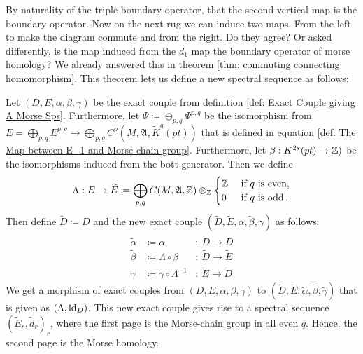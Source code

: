 \begin{corollary}
\begin{fdiagram}
	\end{fdiagram}
\end{corollary}By naturality of the triple boundary operator, that the second vertical map is the boundary operator. Now on the next rug we can induce two maps. From the left to make the diagram commute and from the right. Do they agree? Or asked differently, is the map induced from the $d_1$ map the boundary operator of morse homology? We already answered this in theorem \ref{thm: commuting connecting homomorphism}. This theorem lets us define a new spectral sequence as follows:
\begin{definition}
	Let $(D,E,\alpha,\beta,\gamma)$ be the exact couple from definition \ref{def: Exact Couple giving A Morse Sps}. Furthermore, let $\Psi\coloneq \oplus _{p,q}\Psi^{p,q}$ be the isomorphism from $E=\bigoplus_{p,q} E^{p,q}\to \bigoplus_{p,q} C^{p}(M,\mathfrak{A},\widetilde{K}^q(pt))$ that is defined in equation \ref{def: The Map between E_1 and Morse chain group}. Furthermore, let $\beta:K^{2s}(pt)\to \mathbb{Z})$ be the isomorphisms induced from the bott generator. Then we define
	\begin{equation*}
		\Lambda: E \to \widetilde{E}\coloneq \bigoplus_{p,q} C(M,\mathfrak{A},\mathbb{Z}) \otimes_{\mathbb{Z}}
		\begin{cases}
			\mathbb{Z} &\text{ if $q$ is even,}\\
			0 &\text{ if $q$ is odd}\,.
		\end{cases}
	\end{equation*} Then define $\widetilde{D}\coloneq D$ and the new exact couple $(\widetilde{D},\widetilde{E},\widetilde{\alpha},\widetilde{\beta},\widetilde{\gamma})$ as follows:
	\begin{equation*}
		\begin{array}{lll}
			\widetilde{\alpha}&\coloneq\alpha                     &:~\widetilde{D} \to \widetilde{D}\\
			\widetilde{\beta} &\coloneq \Lambda \circ \beta       &:~\widetilde{D} \to \widetilde{E}\\
			\widetilde{\gamma}&\coloneq \gamma \circ \Lambda^{-1} &:~\widetilde{E} \to \widetilde{D}
		\end{array}
	\end{equation*} We get a morphism of exact couples from $(D,E, \alpha,\beta,\gamma)$ to $(\widetilde{D},\widetilde{E},\widetilde{\alpha},\widetilde{\beta},\widetilde{\gamma})$ that is given as $(\Lambda,\operatorname{\mathrm{id}}_D)$.
	This new exact couple gives rise to a spectral sequence $(\widetilde{E}_r,\widetilde{d}_r)_r$, where the first page is the Morse-chain group in all even $q$.
	Hence, the second page is the Morse homology.
\end{definition}

